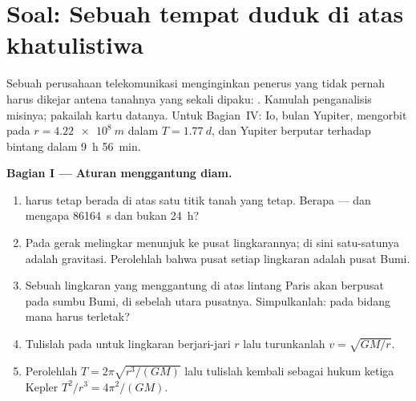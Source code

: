 \section{Soal: Sebuah tempat duduk di atas khatulistiwa}

\begin{problem}
\label{pb:g12:satellites-kepler:1}
Sebuah perusahaan telekomunikasi menginginkan penerus  yang tidak
pernah harus dikejar antena tanahnya yang sekali dipaku: 
. Kamulah penganalisis misinya; pakailah kartu datanya. Untuk
Bagian~IV: Io, bulan Yupiter, mengorbit pada $r = \qty{4.22e8}{m}$ dalam
$T = \qty{1.77}{d}$, dan Yupiter berputar terhadap bintang dalam \qty{9}{h} \qty{56}{min}.

\medskip
\noindent\textbf{Bagian I --- Aturan menggantung diam.}
\begin{enumerate}
  \item {} harus tetap berada di atas satu titik tanah yang tetap.
        Berapa  --- dan mengapa 
        \qty{86164}{s} dan bukan \qty{24}{h}?
  \item Pada gerak melingkar  menunjuk ke pusat lingkarannya;
        di sini satu-satunya  adalah gravitasi. Perolehlah bahwa
        pusat setiap  lingkaran adalah pusat Bumi.
  \item Sebuah lingkaran yang menggantung di atas lintang Paris akan berpusat
        pada sumbu Bumi, di sebelah utara pusatnya. Simpulkanlah: pada bidang
        mana  harus terletak?
  \item Tulislah  pada  untuk 
        lingkaran berjari-jari $r$ lalu turunkanlah $v = \sqrt{GM/r}$.
  \item Perolehlah $T = 2\pi\sqrt{r^3/(GM)}$ lalu tulislah kembali sebagai
        hukum ketiga Kepler $T^2/r^3 = 4\pi^2/(GM)$.
\end{enumerate}


\end{problem}
